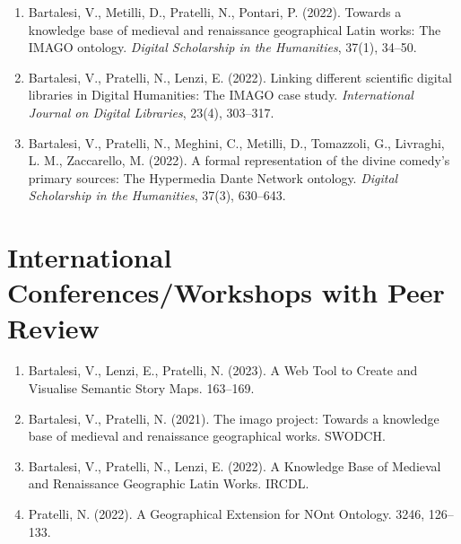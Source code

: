 \begin{enumerate}
    \item Bartalesi, V., Metilli, D., Pratelli, N.,  Pontari, P. (2022). Towards a knowledge base of medieval and renaissance geographical Latin works: The IMAGO ontology. \emph{Digital Scholarship in the Humanities}, 37(1), 34–50.
    \item Bartalesi, V., Pratelli, N., Lenzi, E. (2022). Linking different scientific digital libraries in Digital Humanities: The IMAGO case study. \emph{International Journal on Digital Libraries}, 23(4), 303–317.
    \item Bartalesi, V., Pratelli, N., Meghini, C., Metilli, D., Tomazzoli, G., Livraghi, L. M., Zaccarello, M. (2022). A formal representation of the divine comedy’s primary sources: The Hypermedia Dante Network ontology. \emph{Digital Scholarship in the Humanities}, 37(3), 630–643.
\end{enumerate}

\section*{International Conferences/Workshops with Peer Review}
\begin{enumerate}
    
    \item Bartalesi, V., Lenzi, E., Pratelli, N. (2023). A Web Tool to Create and Visualise Semantic Story Maps. 163–169.
    \item Bartalesi, V., Pratelli, N. (2021). The imago project: Towards a knowledge base of medieval and renaissance geographical works. SWODCH.
    \item Bartalesi, V., Pratelli, N., Lenzi, E. (2022). A Knowledge Base of Medieval and Renaissance Geographic Latin Works. IRCDL.
    \item Pratelli, N. (2022). A Geographical Extension for NOnt Ontology. 3246, 126–133.
\end{enumerate}

